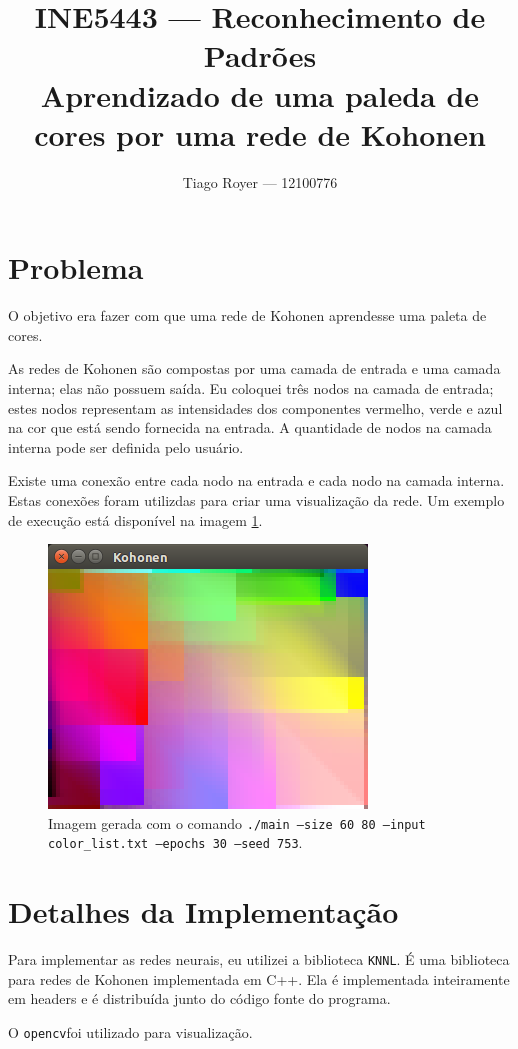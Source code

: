 \documentclass{article}
\newcommand{\KNNL}{{\lstinline"KNNL"}}
\newcommand{\opencv}{{\lstinline"opencv"}}
\begin{document}
\title{
    INE5443 --- Reconhecimento de Padrões\\
    Aprendizado de uma paleda de cores por uma rede de Kohonen
}
\author{
    Tiago Royer --- 12100776
}

\maketitle

\section{Problema}

O objetivo era fazer com que uma rede de Kohonen aprendesse uma paleta de cores.

As redes de Kohonen são compostas por uma camada de entrada e uma camada interna;
elas não possuem saída.
Eu coloquei três nodos na camada de entrada;
estes nodos representam as intensidades dos componentes vermelho, verde e azul
na cor que está sendo fornecida na entrada.
A quantidade de nodos na camada interna pode ser definida pelo usuário.

Existe uma conexão entre cada nodo na entrada e cada nodo na camada interna.
Estas conexões foram utilizdas para criar uma visualização da rede.
Um exemplo de execução está disponível na imagem \ref{demo1}.

\begin{figure}[h]
    \centering
    \includegraphics[scale=0.5]{demo1.png}
    \caption{
        Imagem gerada com o comando
        \texttt{./main --size 60 80 --input color\_list.txt --epochs 30 --seed 753}.
    }
    \label{demo1}
\end{figure}

\section{Detalhes da Implementação}

Para implementar as redes neurais, eu utilizei a biblioteca \KNNL.
É uma biblioteca para redes de Kohonen implementada em C++.
Ela é implementada inteiramente em headers
e é distribuída junto do código fonte do programa.

O \opencv foi utilizado para visualização.
\end{document}
